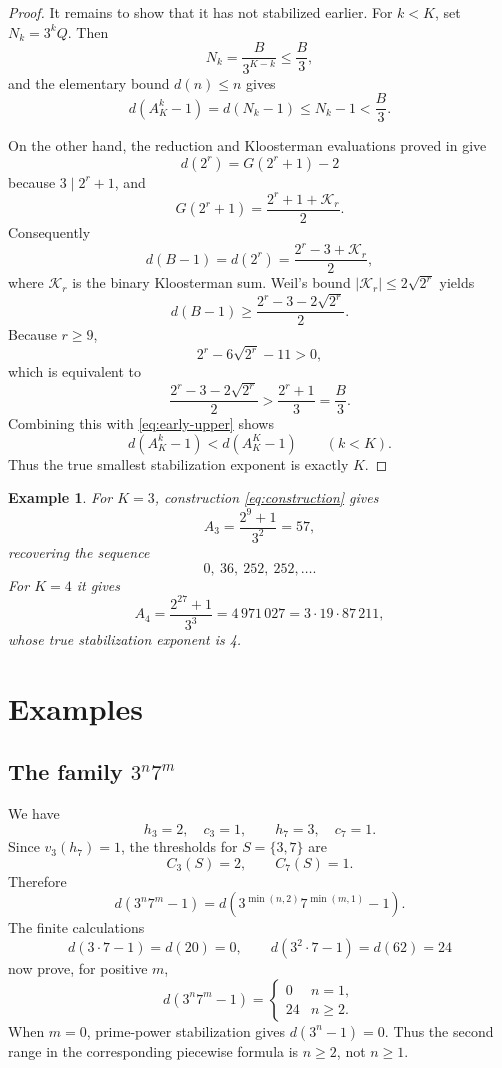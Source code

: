 \documentclass[a4paper]{article}
\newtheorem{example}[theorem]{Example}
\newcommand{\abs}[1]{\left|#1\right|}
\begin{document}
\begin{proof}
	It remains to show that it has not stabilized earlier.
	For $k<K$, set $N_k=3^kQ$.
	Then
	\[
		N_k=\frac{B}{3^{K-k}}\leq\frac{B}{3},
	\]
	and the elementary bound $d(n)\leq n$ gives
	\begin{equation}\label{eq:early-upper}
		d(A_K^k-1)=d(N_k-1)\leq N_k-1<\frac{B}{3}.
	\end{equation}

	On the other hand, the reduction and Kloosterman evaluations proved in
	 give
	\[
		d(2^r)=G(2^r+1)-2
	\]
	because $3\mid2^r+1$, and
	\[
		G(2^r+1)=\frac{2^r+1+\mathcal{K}_r}{2}.
	\]
	Consequently
	\[
		d(B-1)
		=
		d(2^r)
		=
		\frac{2^r-3+\mathcal{K}_r}{2},
	\]
	where $\mathcal{K}_r$ is the binary Kloosterman sum.
	Weil's bound $\abs{\mathcal{K}_r}\leq2\sqrt{2^r}$ \cite{Weil1948} yields
	\[
		d(B-1)
		\geq
		\frac{2^r-3-2\sqrt{2^r}}{2}.
	\]
	Because $r\geq9$,
	\[
		2^r-6\sqrt{2^r}-11>0,
	\]
	which is equivalent to
	\[
		\frac{2^r-3-2\sqrt{2^r}}{2}
		>
		\frac{2^r+1}{3}
		=
		\frac{B}{3}.
	\]
	Combining this with \eqref{eq:early-upper} shows
	\[
		d(A_K^k-1)<d(A_K^K-1)
		\qquad(k<K).
	\]
	Thus the true smallest stabilization exponent is exactly $K$.
\end{proof}

\begin{example}
	For $K=3$, construction \eqref{eq:construction} gives
	\[
		A_3=\frac{2^9+1}{3^2}=57,
	\]
	recovering the sequence
	\[
		0,\ 36,\ 252,\ 252,\ldots.
	\]
	For $K=4$ it gives
	\[
		A_4=\frac{2^{27}+1}{3^3}
		=4\,971\,027
		=3\cdot19\cdot87\,211,
	\]
	whose true stabilization exponent is 4.
\end{example}

\section{Examples}

\subsection{The family $3^n7^m$}

We have
\[
	h_3=2,\quad c_3=1,
	\qquad
	h_7=3,\quad c_7=1.
\]
Since $v_3(h_7)=1$, the thresholds for $S=\{3,7\}$ are
\[
	C_3(S)=2,
	\qquad
	C_7(S)=1.
\]
Therefore
\begin{equation}\label{eq:3-7-truncation}
	d(3^n7^m-1)
	=
	d\!\left(3^{\min(n,2)}7^{\min(m,1)}-1\right).
\end{equation}
The finite calculations
\[
	d(3\cdot7-1)=d(20)=0,
	\qquad
	d(3^2\cdot7-1)=d(62)=24
\]
now prove, for positive $m$,
\[
	d(3^n7^m-1)
	=
	\begin{cases}
		0 & n=1,\\
		24 & n\geq2.
	\end{cases}
\]
When $m=0$, prime-power stabilization gives $d(3^n-1)=0$.
Thus the second range in the corresponding piecewise formula is $n\geq2$, not $n\geq1$.
\end{document}
